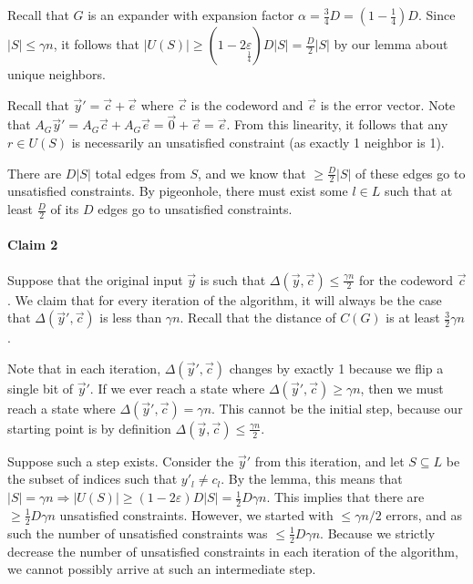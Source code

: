 \documentclass{idc_msc}
\begin{document}
Recall that \(G\) is an expander with expansion factor \(\alpha = \frac{3}{4}D = (1 - \frac{1}{4})D\).
Since \(|S| \le \gamma n\), it follows that \(|U(S)| \ge (1 - 2\underset{\frac{1}{4}}{\varepsilon}) D |S| = \frac{D}{2}|S|\) by our lemma about unique neighbors.

Recall that \(\vec{y}' = \vec{c} + \vec{e}\) where \(\vec{c}\) is the codeword and \(\vec{e}\) is the error vector.
Note that \(A_G \vec{y}' = A_G \vec{c} + A_G \vec{e} = \vec{0} + \vec{e} = \vec{e}\).
From this linearity, it follows that any \(r \in U(S)\) is necessarily an unsatisfied constraint (as exactly 1 neighbor is 1).

There are \(D |S|\) total edges from \(S\), and we know that \(\ge \frac{D}{2} |S|\) of these edges go to unsatisfied constraints.
By pigeonhole, there must exist some \(l \in L\) such that at least \(\frac{D}{2}\) of its \(D\) edges go to unsatisfied constraints.


%
%
%

\paragraph{Claim 2}

Suppose that the original input \(\vec{y}\) is such that \(\Delta(\vec{y}, \vec{c}) \le \frac{\gamma n}{2}\) for the codeword \(\vec{c}\).
We claim that for every iteration of the algorithm, it will always be the case that \(\Delta(\vec{y}', \vec{c})\) is less than \(\gamma n\).
Recall that the distance of \(C(G)\) is at least \(\frac{3}{2}\gamma n\).


Note that in each iteration, \(\Delta(\vec{y}', \vec{c})\) changes by exactly 1 because we flip a single bit of \(\vec{y}'\).
If we ever reach a state where \(\Delta(\vec{y}', \vec{c}) \ge \gamma n\), then we must reach a state where \(\Delta(\vec{y}', \vec{c}) = \gamma n\).
This cannot be the initial step, because our starting point is by definition \(\Delta(\vec{y}, \vec{c}) \le \frac{\gamma n}{2}\).

Suppose such a step exists.
Consider the \(\vec{y}'\) from this iteration, and let \(S \subseteq L\) be the subset of indices such that \(y'_l \ne c_l\).
By the lemma, this means that \(|S| = \gamma n \Rightarrow |U(S)| \ge (1 - 2\varepsilon)D|S| = \frac{1}{2}D \gamma n\).
This implies that there are \(\ge \frac{1}{2}D \gamma n\) unsatisfied constraints.
However, we started with \(\le \gamma n / 2\) errors, and as such the number of unsatisfied constraints was \(\le \frac{1}{2} D \gamma n\).
Because we strictly decrease the number of unsatisfied constraints in each iteration of the algorithm, we cannot possibly arrive at such an intermediate step.
\end{document}
